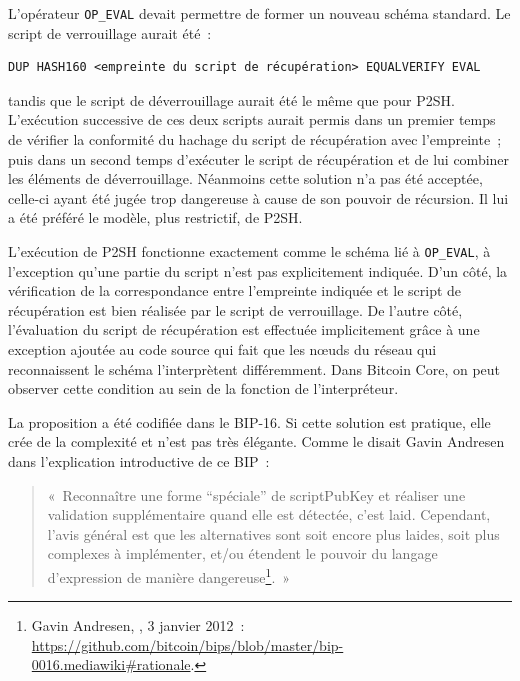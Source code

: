 L'opérateur \texttt{OP\_EVAL} devait permettre de former un nouveau schéma standard. Le script de verrouillage aurait été~:

\begin{Verbatim}[fontsize=\footnotesize]
DUP HASH160 <empreinte du script de récupération> EQUALVERIFY EVAL
\end{Verbatim}

tandis que le script de déverrouillage aurait été le même que pour P2SH. L'exécution successive de ces deux scripts aurait permis dans un premier temps de vérifier la conformité du hachage du script de récupération avec l'empreinte~; puis dans un second temps d'exécuter le script de récupération et de lui combiner les éléments de déverrouillage. Néanmoins cette solution n'a pas été acceptée, celle-ci ayant été jugée trop dangereuse à cause de son pouvoir de récursion. Il lui a été préféré le modèle, plus restrictif, de P2SH.

L'exécution de P2SH fonctionne exactement comme le schéma lié à \texttt{OP\_EVAL}, à l'exception qu'une partie du script n'est pas explicitement indiquée. D'un côté, la vérification de la correspondance entre l'empreinte indiquée et le script de récupération est bien réalisée par le script de verrouillage. De l'autre côté, l'évaluation du script de récupération est effectuée implicitement grâce à une exception ajoutée au code source qui fait que les nœuds du réseau qui reconnaissent le schéma l'interprètent différemment. Dans Bitcoin Core, on peut observer cette condition au sein de la fonction  de l'interpréteur.

La proposition a été codifiée dans le BIP-16. Si cette solution est pratique, elle crée de la complexité et n'est pas très élégante. Comme le disait Gavin Andresen dans l'explication introductive de ce BIP~:

\begin{quote}
«~Reconnaître une forme “spéciale” de scriptPubKey et réaliser une validation supplémentaire quand elle est détectée, c'est laid. Cependant, l'avis général est que les alternatives sont soit encore plus laides, soit plus complexes à implémenter, et/ou étendent le pouvoir du langage d'expression de manière dangereuse\footnote{Gavin Andresen, , 3 janvier 2012~: \url{https://github.com/bitcoin/bips/blob/master/bip-0016.mediawiki\#rationale}.}.~»
\end{quote}


